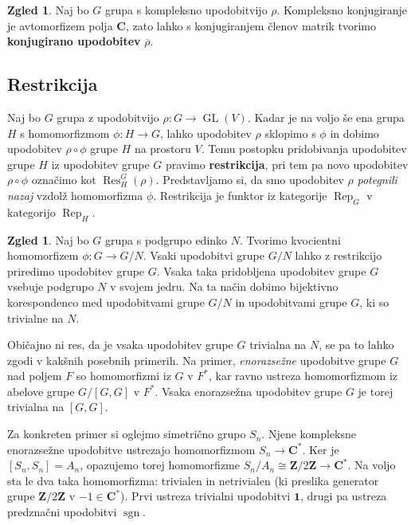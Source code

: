 \documentclass[11pt]{book}
\def\ZZ{\mathbf{Z}}
\def\CC{\mathbf{C}}
\def\oneone{\mathbf{1}}
\DeclareMathOperator\sgn{sgn}
\DeclareMathOperator\Res{Res}
\DeclareMathOperator\Rep{Rep}
\DeclareMathOperator\GL{GL}
\def\definicija{\color{rdeca}\bf}
\theoremstyle{definition}
\theoremstyle{zgled}
\newtheorem{zgled}[theorem]{Zgled}
\theoremstyle{zgledbrezstevilke}
\theoremstyle{odprtproblem}
\theoremstyle{domacanaloga}
\theoremstyle{izrek}
\begin{document}
\begin{zgled}
Naj bo $G$ grupa s kompleksno upodobitvijo $\rho$. Kompleksno konjugiranje je avtomorfizem polja $\CC$, zato lahko s konjugiranjem členov matrik tvorimo {\definicija konjugirano upodobitev} $\overline{\rho}$.
\end{zgled}


\subsection{Restrikcija}

Naj bo $G$ grupa z upodobitvijo $\rho \colon G \to \GL(V)$. Kadar je na voljo še ena grupa $H$ s homomorfizmom $\phi \colon H \to G$, lahko upodobitev $\rho$ sklopimo s $\phi$ in dobimo upodobitev $\rho \circ \phi$ grupe $H$ na prostoru $V$. Temu postopku pridobivanja upodobitev grupe $H$ iz upodobitev grupe $G$ pravimo {\definicija restrikcija}, pri tem pa novo upodobitev $\rho \circ \phi$ označimo kot $\Res^G_H(\rho)$. Predstavljamo si, da smo upodobitev $\rho$ \emph{potegnili nazaj} vzdolž homomorfizma $\phi$. Restrikcija je funktor iz kategorije $\Rep_G$ v kategorijo $\Rep_H$.

\begin{zgled}
Naj bo $G$ grupa s podgrupo edinko $N$. Tvorimo kvocientni homomorfizem $\phi \colon G \to G/N$. Vsaki upodobitvi grupe $G/N$ lahko z restrikcijo priredimo upodobitev grupe $G$. Vsaka taka pridobljena upodobitev grupe $G$ vsebuje podgrupo $N$ v svojem jedru. Na ta način dobimo bijektivno korespondenco med upodobitvami grupe $G/N$ in upodobitvami grupe $G$, ki so trivialne na $N$.

Običajno ni res, da je vsaka upodobitev grupe $G$ trivialna na $N$, se pa to lahko zgodi v kakšnih posebnih primerih. Na primer, \emph{enorazsežne} upodobitve grupe $G$ nad poljem $F$ so homomorfizmi iz $G$ v $F^*$, kar ravno ustreza homomorfizmom iz abelove grupe $G/[G,G]$ v $F^*$. Vsaka enorazsežna upodobitev grupe $G$ je torej trivialna na $[G,G]$.

Za konkreten primer si oglejmo simetrično grupo $S_n$. Njene kompleksne enorazsežne upodobitve ustrezajo homomorfizmom $S_n \to \CC^*$. Ker je $[S_n, S_n] = A_n$, opazujemo torej homomorfizme $S_n/A_n \cong \ZZ/2\ZZ \to \CC^*$. Na voljo sta le dva taka homomorfizma: trivialen in netrivialen (ki preslika generator grupe $\ZZ/2\ZZ$ v $-1 \in \CC^*$). Prvi ustreza trivialni upodobitvi $\oneone$, drugi pa ustreza predznačni upodobitvi $\sgn$.
\end{zgled}
\end{document}
